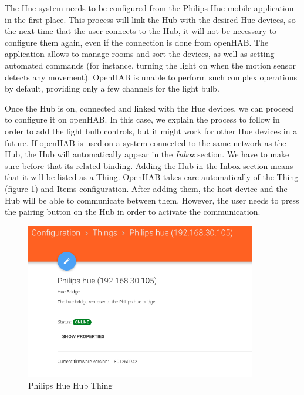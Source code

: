 The Hue system needs to be configured from the Philips Hue mobile application in the first place. This process will link the Hub with the
desired Hue devices, so the next time that the user connects to the Hub, it will not be necessary to configure them again, even if
the connection is done from openHAB. The application allows to manage rooms and sort the devices, as well as setting automated commands
(for instance, turning the light on when the motion sensor detects any movement). OpenHAB is unable to perform such complex operations
by default, providing only a few channels for the light bulb.

Once the Hub is on, connected and linked with the Hue devices, we can proceed to configure it on openHAB. In this case, we explain
the process to follow in order to add the light bulb controls, but it might work for other Hue devices in a future. If openHAB is
used on a system connected to the same network as the Hub, the Hub will automatically appear in the \textit{Inbox} section. We have
to make sure before that its related binding. Adding the Hub in the Inbox section means that it will be listed as a Thing. OpenHAB
takes care automatically of the Thing (figure \ref{fig:philips-hue-hub-thing}) and Items configuration. After adding them, the host
device and the Hub will be able to communicate between them. However, the user needs to press the pairing button on the Hub in
order to activate the communication.

\begin{figure}
    \centering
    \includegraphics[width=0.9\textwidth]{images/Chapter_06/philips-hue-hub-thing.png}
    \caption{Philips Hue Hub Thing}
    \label{fig:philips-hue-hub-thing}
\end{figure}

